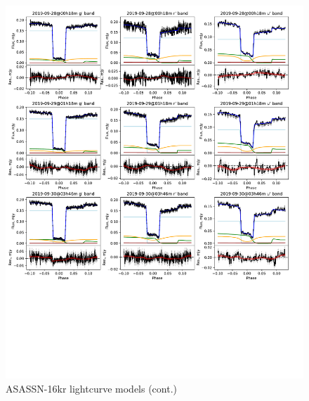\begin{figure}
    \centering
    \includegraphics[width=\columnwidth, trim={0 10cm 0 0}, clip]{figures/three_cvs_with_weird_colours/ASASSN-16kr/ASASSN-16kr_lightcurves_6.pdf}
    \caption{ASASSN-16kr lightcurve models (cont.)}
    \label{fig:ASASSN-16kr all lightcurves cont}
\end{figure}


